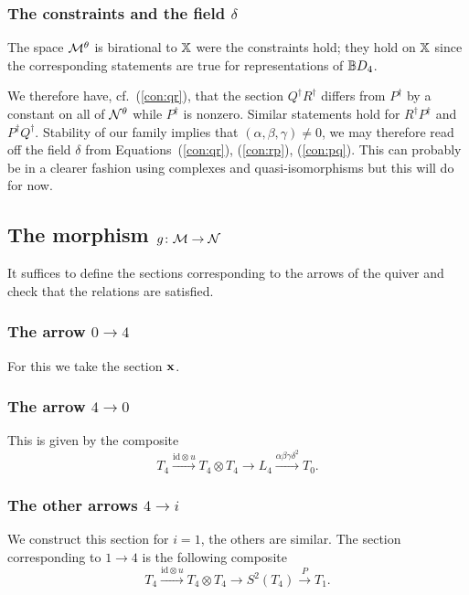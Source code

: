 \documentclass{amsart}
\theoremstyle{definition}
\begin{document}
\subsubsection{The constraints and the field $\delta$}

The space $\mathcal{M}^\theta$ is birational to $\mathbb{X}$ were the constraints hold; they hold on $\mathbb{X}$ since the corresponding statements are true for representations of $\mathbb{B} D_4$.

We therefore have, cf.\ (\ref{con:qr}), that the section $Q^\dagger R^\dagger$ differs from $P^\dagger$ by a constant on all of $\mathcal{N}^\theta$ while $P^\dagger$ is nonzero.
Similar statements hold for $R^\dagger P^\dagger$ and $P^\dagger Q^\dagger$.
Stability of our family implies that $(\alpha, \beta, \gamma) \neq 0$, we may therefore read off the field $\delta$ from Equations~(\ref{con:qr}), (\ref{con:rp}), (\ref{con:pq}). 
This can probably be in a clearer fashion using complexes and quasi-isomorphisms but this will do for now.



\subsection{The morphism $g \colon \mathcal{M} \rightarrow \mathcal{N}$}

It suffices to define the sections corresponding to the arrows of the quiver and check that the relations are satisfied.

\subsubsection{The arrow $0 \rightarrow 4$}

For this we take the section $\mathbf{x}$.

\subsubsection{The arrow $4 \rightarrow 0$}
This is given by the composite
$$T_4 \xrightarrow{\text{id}\otimes u} T_4 \otimes T_4 \rightarrow L_4 \xrightarrow{\alpha\beta\gamma\delta^2} T_0.$$

\subsubsection{The other arrows $4 \rightarrow i$}
We construct this section for $i=1$, the others are similar.
The section corresponding to $1 \rightarrow 4$ is the following composite $$T_4 \xrightarrow{\text{id}\otimes u} T_4 \otimes T_4 \rightarrow S^2(T_4) \xrightarrow{P} T_1.$$
\end{document}
